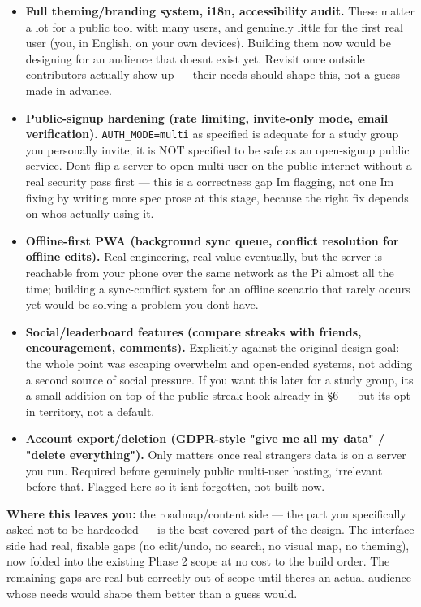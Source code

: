 \begin{itemize}
\tightlist
\item
  \textbf{Full theming/branding system, i18n, accessibility audit.}
  These matter a lot for a public tool with many users, and genuinely
  little for the first real user (you, in English, on your own devices).
  Building them now would be designing for an audience that
  doesn\textquotesingle t exist yet. Revisit once outside contributors
  actually show up --- their needs should shape this, not a guess made
  in advance.
\item
  \textbf{Public-signup hardening (rate limiting, invite-only mode,
  email verification).} \texttt{AUTH\_MODE=multi} as specified is
  adequate for a study group you personally invite; it is NOT specified
  to be safe as an open-signup public service. Don\textquotesingle t
  flip a server to open multi-user on the public internet without a real
  security pass first --- this is a correctness gap I\textquotesingle m
  flagging, not one I\textquotesingle m fixing by writing more spec
  prose at this stage, because the right fix depends on
  who\textquotesingle s actually using it.
\item
  \textbf{Offline-first PWA (background sync queue, conflict resolution
  for offline edits).} Real engineering, real value eventually, but the
  server is reachable from your phone over the same network as the Pi
  almost all the time; building a sync-conflict system for an offline
  scenario that rarely occurs yet would be solving a problem you
  don\textquotesingle t have.
\item
  \textbf{Social/leaderboard features (compare streaks with friends,
  encouragement, comments).} Explicitly against the original design
  goal: the whole point was escaping overwhelm and open-ended systems,
  not adding a second source of social pressure. If you want this later
  for a study group, it\textquotesingle s a small addition on top of the
  public-streak hook already in §6 --- but it\textquotesingle s opt-in
  territory, not a default.
\item
  \textbf{Account export/deletion (GDPR-style "give me all my data" /
  "delete everything").} Only matters once real
  strangers\textquotesingle{} data is on a server you run. Required
  before genuinely public multi-user hosting, irrelevant before that.
  Flagged here so it isn\textquotesingle t forgotten, not built now.
\end{itemize}

\textbf{Where this leaves you:} the roadmap/content side --- the part
you specifically asked not to be hardcoded --- is the best-covered part
of the design. The interface side had real, fixable gaps (no edit/undo,
no search, no visual map, no theming), now folded into the existing
Phase 2 scope at no cost to the build order. The remaining gaps are real
but correctly out of scope until there\textquotesingle s an actual
audience whose needs would shape them better than a guess would.
